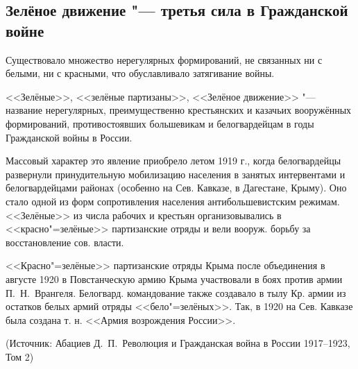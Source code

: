 \subsection{Зелёное движение "--- третья сила в Гражданской войне}

Существовало множество нерегулярных формирований, не связанных ни с белыми, ни с красными, что обуславливало затягивание войны.

<<Зелёные>>, <<зелёные партизаны>>, <<Зелёное движение>> "--- название нерегулярных, преимущественно крестьянских и казачьих вооружённых формирований, противостоявших большевикам и белогвардейцам в годы Гражданской войны в России.

Массовый характер это явление приобрело летом 1919 г., когда белогвардейцы развернули принудительную мобилизацию населения в занятых интервентами и белогвардейцами районах (особенно на Сев. Кавказе, в Дагестане, Крыму).
Оно стало одной из форм сопротивления населения антибольшевистским режимам.
<<Зелёные>> из числа рабочих и крестьян организовывались в <<красно"=зелёные>> партизанские отряды и вели вооруж. борьбу за восстановление сов. власти.

<<Красно"=зелёные>> партизанские отряды Крыма после объединения в августе 1920 в Повстанческую армию Крыма участвовали в боях против армии П.~Н.~Врангеля.
Белогвард. командование также создавало в тылу Кр. армии из остатков белых армий отряды <<бело"=зелёных>>. Так, в 1920 на Сев. Кавказе была создана т. н. <<Армия возрождения России>>.

(Источник: Абациев Д.~П.~Революция и Гражданская война в России 1917--1923, Том 2)
